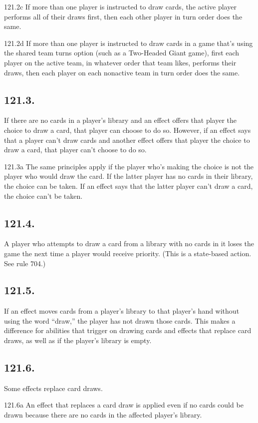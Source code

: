 121.2c If more than one player is instructed to draw cards, the active player performs all of their draws first, then each other player in turn order does the same.

121.2d If more than one player is instructed to draw cards in a game that’s using the shared team turns option (such as a Two-Headed Giant game), first each player on the active team, in whatever order that team likes, performs their draws, then each player on each nonactive team in turn order does the same.

\subsection*{121.3.}
If there are no cards in a player’s library and an effect offers that player the choice to draw a card, that player can choose to do so. However, if an effect says that a player can’t draw cards and another effect offers that player the choice to draw a card, that player can’t choose to do so.

121.3a The same principles apply if the player who’s making the choice is not the player who would draw the card. If the latter player has no cards in their library, the choice can be taken. If an effect says that the latter player can’t draw a card, the choice can’t be taken.

\subsection*{121.4.}
A player who attempts to draw a card from a library with no cards in it loses the game the next time a player would receive priority. (This is a state-based action. See rule 704.)

\subsection*{121.5.}
If an effect moves cards from a player’s library to that player’s hand without using the word “draw,” the player has not drawn those cards. This makes a difference for abilities that trigger on drawing cards and effects that replace card draws, as well as if the player’s library is empty.

\subsection*{121.6.}
Some effects replace card draws.

121.6a An effect that replaces a card draw is applied even if no cards could be drawn because there are no cards in the affected player’s library.

